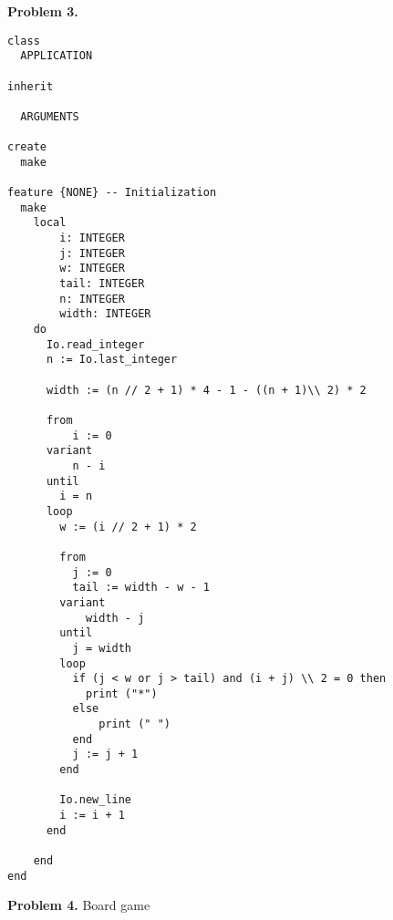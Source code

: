 \documentclass[a4paper,12pt]{article}
\newenvironment{problem}[1]{\par\bigskip\noindent\textbf{Problem #1.}
  \enskip\ignorespaces}{}
\begin{document}
  \begin{problem}{3}
    \begin{verbatim}
class
  APPLICATION

inherit

  ARGUMENTS

create
  make

feature {NONE} -- Initialization
  make
    local
        i: INTEGER
        j: INTEGER
        w: INTEGER
        tail: INTEGER
        n: INTEGER
        width: INTEGER
    do
      Io.read_integer
      n := Io.last_integer

      width := (n // 2 + 1) * 4 - 1 - ((n + 1)\\ 2) * 2

      from
          i := 0
      variant
          n - i
      until
        i = n
      loop
        w := (i // 2 + 1) * 2

        from
          j := 0
          tail := width - w - 1
        variant
            width - j
        until
          j = width
        loop
          if (j < w or j > tail) and (i + j) \\ 2 = 0 then
            print ("*")
          else
              print (" ")
          end
          j := j + 1
        end

        Io.new_line
        i := i + 1
      end

    end
end
    \end{verbatim}
  \end{problem}

  \begin{problem}{4}
    Board game

    \inputminted{eiffel}{application.e}
     \\

    \inputminted{eiffel}{game.e}
     \\

    \inputminted{eiffel}{die.e}
     \\

    \inputminted{eiffel}{player.e}
  \end{problem}
\end{document}
